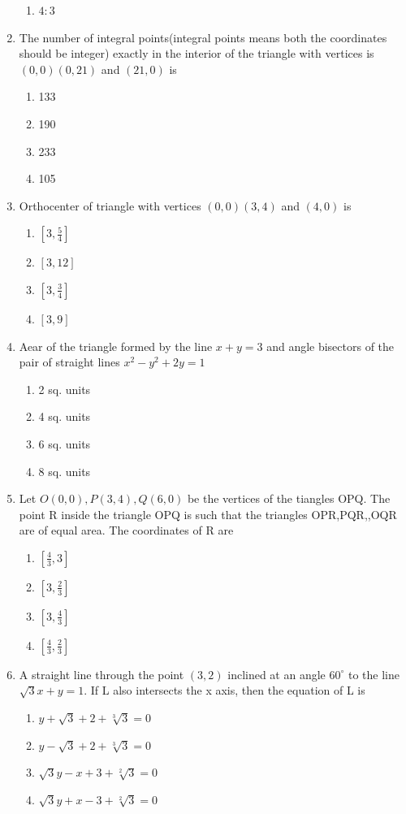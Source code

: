 \documentclass[12pt]{article}
\begin{document}
\begin{enumerate}
\begin{enumerate}
\item$4:3$ 
\end{enumerate}
\item The number of integral points(integral points means both the coordinates should be integer) exactly in the interior of the triangle with vertices is $(0,0)(0,21)$ and $(21,0)$ is
\begin{enumerate}
\item 133  
\item 190  
\item 233 
\item 105
\end{enumerate}
\item Orthocenter of triangle with vertices $(0,0)(3,4)$ and $(4,0)$ is 
\begin{enumerate}
\item $[3,\frac{5}{4}]$ 
\item$[3,12]$   
\item $[3,\frac{3}{4}]$ 
\item$[3,9]$
\end{enumerate}
\item Aear of the triangle formed by the line $x+y=3$ and angle bisectors of the pair of straight lines $x^2-y^2+2y=1$
\begin{enumerate}
\item  2 sq. units  
\item  4 sq. units 
\item  6 sq. units    
\item 8 sq. units
\end{enumerate}
\item Let $O(0,0),P(3,4),Q(6,0)$ be the vertices of the tiangles OPQ. The point R inside the triangle OPQ is such that the triangles OPR,PQR,,OQR are of equal area. The coordinates of R are 
\begin{enumerate}
\item $[\frac{4}{3}, 3]$   
\item $[3, \frac{2}{3}]$  
\item   $[3, \frac{4}{3}]$  
\item $[\frac{4}{3}, \frac{2}{3}]$
\end{enumerate}
\item A straight line through the point $(3,2)$ inclined at an angle $ 60^\circ $  to the line $\sqrt{3}x+y=1$. If L also intersects the x axis, then the equation of L is 
\begin{enumerate}
\item  $y+\sqrt{3}+2+\sqrt[3]{3}=0$
 \item  $y-\sqrt{3}+2+\sqrt[3]{3}=0$ 
 \item  $\sqrt{3}y-x+3+\sqrt[2]{3}=0$  
 \item  $\sqrt{3}y+x-3+\sqrt[2]{3}=0$
\end{enumerate}

\end{enumerate}
\end{document}
